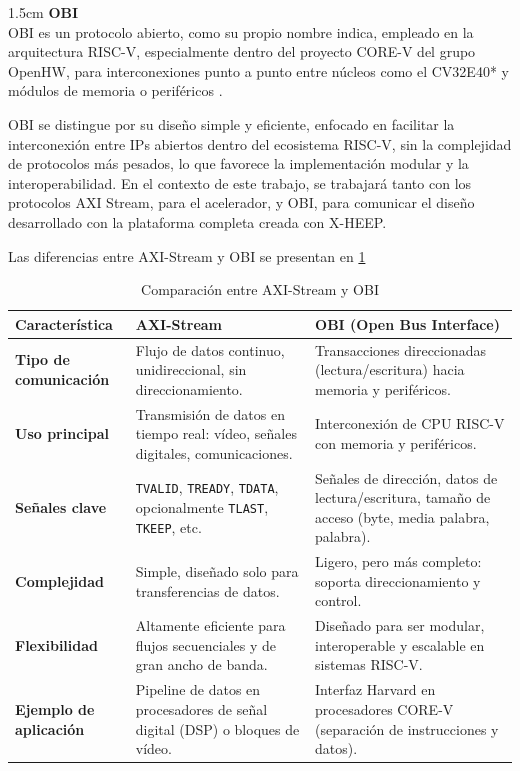 \begin{adjustwidth}{1.5cm}{}
\label{st:obi}
\textbf{OBI} \vspace{0.25cm} \\
\ac{OBI} es un protocolo abierto, como su propio nombre indica, empleado en la arquitectura RISC-V, especialmente dentro del proyecto CORE-V del grupo OpenHW, para interconexiones punto a punto entre núcleos como el CV32E40* y módulos de memoria o periféricos \cite{infoOBI} \cite{ openhw-docs}.   

OBI se distingue por su diseño simple y eficiente, enfocado en facilitar la interconexión entre IPs abiertos dentro del ecosistema RISC-V, sin la complejidad de protocolos más pesados, lo que favorece la implementación modular y la interoperabilidad. En el contexto de este trabajo, se trabajará tanto con los protocolos AXI Stream, para el acelerador, y OBI, para comunicar el diseño desarrollado con la plataforma completa creada con X-HEEP.

Las diferencias entre AXI-Stream y OBI se presentan en \ref{tbl:diferenciasAxiObi}

\begin{table}[h!]
\centering
  \begin{tabular}{|>{\bfseries}m{4cm}|m{5.5cm}|m{5.5cm}|}
    \hline
    Característica & AXI-Stream & OBI (Open Bus Interface) \\
    \hline
    Tipo de comunicación & Flujo de datos continuo, unidireccional, sin direccionamiento. & Transacciones direccionadas (lectura/escritura) hacia memoria y periféricos. \\
    \hline
    Uso principal & Transmisión de datos en tiempo real: vídeo, señales digitales, comunicaciones. & Interconexión de CPU RISC-V con memoria y periféricos. \\
    \hline
    Señales clave & \texttt{TVALID}, \texttt{TREADY}, \texttt{TDATA}, opcionalmente \texttt{TLAST}, \texttt{TKEEP}, etc. & Señales de dirección, datos de lectura/escritura, tamaño de acceso (byte, media palabra, palabra). \\
    \hline
    Complejidad & Simple, diseñado solo para transferencias de datos. & Ligero, pero más completo: soporta direccionamiento y control. \\
    \hline
    Flexibilidad & Altamente eficiente para flujos secuenciales y de gran ancho de banda. & Diseñado para ser modular, interoperable y escalable en sistemas RISC-V. \\
    \hline
    Ejemplo de aplicación & Pipeline de datos en procesadores de señal digital (DSP) o bloques de vídeo. & Interfaz Harvard en procesadores CORE-V (separación de instrucciones y datos). \\
    \hline
  \end{tabular}
\caption{Comparación entre AXI-Stream y OBI}
\label{tbl:diferenciasAxiObi}
\end{table}
\end{adjustwidth}

